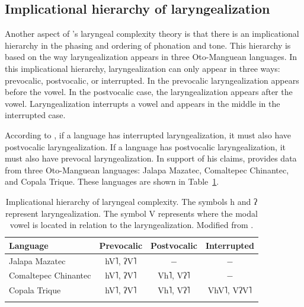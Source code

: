\subsection{Implicational hierarchy of laryngealization}\label{sec:implicational_hierarchy}

Another aspect of \citeauthor{silvermanLaryngealComplexityOtomanguean1997}'s \citeyear{silvermanLaryngealComplexityOtomanguean1997} laryngeal complexity theory is that there is an implicational hierarchy in the phasing and ordering of phonation and tone. This hierarchy is based on the way laryngealization appears in three Oto-Manguean languages. In this implicational hierarchy, laryngealization can only appear in three ways: prevocalic, postvocalic, or interrupted. In the prevocalic laryngealization appears before the vowel. In the postvocalic case, the laryngealization appears after the vowel. Laryngealization interrupts a vowel and appears in the middle in the interrupted case.

According to \citet{silvermanLaryngealComplexityOtomanguean1997}, if a language has interrupted laryngealization, it must also have postvocalic laryngealization. If a language has postvocalic laryngealization, it must also have prevocal laryngealization. In support of his claims, \citet{silvermanLaryngealComplexityOtomanguean1997} provides data from three Oto-Manguean languages: Jalapa Mazatec, Comaltepec Chinantec, and Copala Trique. These languages are shown in Table~\ref{tab:implicational_hierarchy}.

\begin{table}[h!]
    \centering
    \caption{Implicational hierarchy of laryngeal complexity. The symbols h and ʔ represent laryngealization. The symbol V represents where the modal vowel is located in relation to the laryngealization. Modified from \citet{silvermanLaryngealComplexityOtomanguean1997}.} 
    \label{tab:implicational_hierarchy}
    \begin{tabular}{lccc}
        \lsptoprule
        \textbf{Language} & \textbf{Prevocalic} & \textbf{Postvocalic} & \textbf{Interrupted} \\
        \hline 
        Jalapa Mazatec & hV˥, ʔV˥ & $-$ & $-$ \\
        Comaltepec Chinantec & hV˥, ʔV˥ & Vh˥, Vʔ˥ & $-$ \\
        Copala Trique & hV˥, ʔV˥ & Vh˥, Vʔ˥ & VhV˥, VʔV˥ \\
        \lspbottomrule
    \end{tabular}
\end{table}

